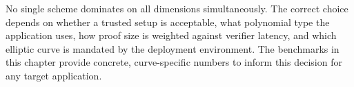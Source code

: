 No single scheme dominates on all dimensions simultaneously. The
correct choice depends on whether a trusted setup is acceptable, what
polynomial type the application uses, how proof size is weighted
against verifier latency, and which elliptic curve is mandated by the
deployment environment. The benchmarks in this chapter provide
concrete, curve-specific numbers to inform this decision for any
target application.
